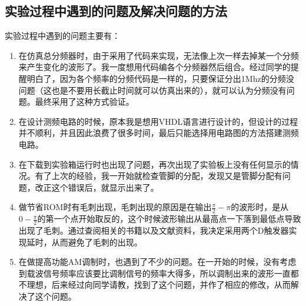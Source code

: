 \documentclass[12pt]{article}
\begin{document}
\subsection{实验过程中遇到的问题及解决问题的方法}
实验过程中遇到的问题主要有：
\begin{enumerate}[1、]
\item 在仿真总分频器时，由于采用了代码来实现，无法像上次一样去掉某一个分频来产生变化的波形了。我一度想用代码编各个分频器然后组合。经过同学的提醒明白了，因为各个频率的分频代码是一样的，只要保证分出1Mhz的分频没问题（这也是不要用长截止时间就可以仿真出来的），就可以认为分频没有问题。最终采用了这种方式验证。
\item 在设计测频电路的时候，原本我是想用VHDL语言进行设计的，但设计的过程并不顺利，并且因此浪费了很多时间，最后只能选择用电路图的方法搭建测频电路。
\item 在下载到实验箱运行时也出现了问题，再次出现了实验板上没有任何显示的情况。有了上次的经验，我一开始就检查管脚的分配，发现又是管脚分配有问题，改正这个错误后，就显示出来了。
\item 做节省ROM时有毛刺出现，毛刺出现的原因是在输出$\frac{\pi}{2}-\pi$的波形时，是从$0-\frac{\pi}{2}$的第一个点开始取反的，这个时候波形输出从最高点一下落到最低点导致出现了毛刺。通过查阅相关的书籍以及文献资料，我决定采用两个D触发器实现延时，从而避免了毛刺的出现。
\item 在做提高功能AM调制时，也遇到了不少的问题。在一开始的时候，没有考虑到载波信号频率应该要比调制信号的频率大得多，所以调制出来的波形一直都不理想，后来经过向同学请教，找到了这个问题，并作了相应的修改，从而解决了这个问题。
\end{enumerate}
\end{document}
